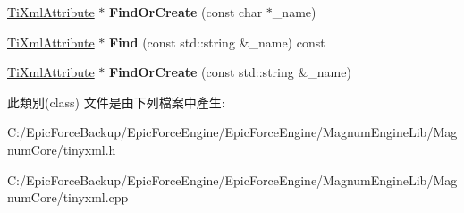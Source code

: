 \begin{DoxyCompactItemize}
\item 
\hyperlink{class_ti_xml_attribute}{Ti\+Xml\+Attribute} $\ast$ {\bfseries Find\+Or\+Create} (const char $\ast$\+\_\+name)\hypertarget{class_ti_xml_attribute_set_a5e28f5d32f048fba85d04dc317495bdc}{}\label{class_ti_xml_attribute_set_a5e28f5d32f048fba85d04dc317495bdc}

\item 
\hyperlink{class_ti_xml_attribute}{Ti\+Xml\+Attribute} $\ast$ {\bfseries Find} (const std\+::string \&\+\_\+name) const \hypertarget{class_ti_xml_attribute_set_ab6d6c98b99a257e38fec81cae36a54d1}{}\label{class_ti_xml_attribute_set_ab6d6c98b99a257e38fec81cae36a54d1}

\item 
\hyperlink{class_ti_xml_attribute}{Ti\+Xml\+Attribute} $\ast$ {\bfseries Find\+Or\+Create} (const std\+::string \&\+\_\+name)\hypertarget{class_ti_xml_attribute_set_acccd76e3d87a92caed2795266c6e540e}{}\label{class_ti_xml_attribute_set_acccd76e3d87a92caed2795266c6e540e}

\end{DoxyCompactItemize}


此類別(class) 文件是由下列檔案中產生\+:\begin{DoxyCompactItemize}
\item 
C\+:/\+Epic\+Force\+Backup/\+Epic\+Force\+Engine/\+Epic\+Force\+Engine/\+Magnum\+Engine\+Lib/\+Magnum\+Core/tinyxml.\+h\item 
C\+:/\+Epic\+Force\+Backup/\+Epic\+Force\+Engine/\+Epic\+Force\+Engine/\+Magnum\+Engine\+Lib/\+Magnum\+Core/tinyxml.\+cpp\end{DoxyCompactItemize}

